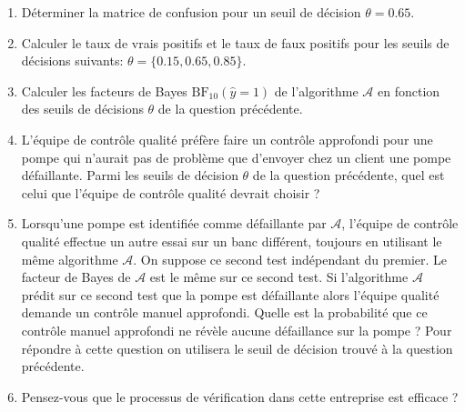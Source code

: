 \documentclass[solutions]{../exercices}
\begin{document}
\begin{exercice}
		\begin{enumerate}
			\item Déterminer la matrice de confusion pour un seuil de décision $\theta = 0.65$.
			\item Calculer le taux de vrais positifs et le taux de faux positifs pour les seuils de décisions suivants: $\theta = \{0.15, 0.65, 0.85\}$.
			\item Calculer les facteurs de Bayes $\text{BF}_{10}(\hat{y} = 1)$ de l'algorithme $\mathcal{A}$ en fonction des seuils de décisions $\theta$ de la question précédente.
			\item L'équipe de contrôle qualité préfère faire un contrôle approfondi pour une pompe qui n'aurait pas de problème que d'envoyer chez un client une pompe défaillante. Parmi les seuils de décision $\theta$ de la question précédente, quel est celui que l'équipe de contrôle qualité devrait choisir ?
			\item Lorsqu'une pompe est identifiée comme défaillante par $\mathcal{A}$, l'équipe de contrôle qualité effectue un autre essai sur un banc différent, toujours en utilisant le même algorithme $\mathcal{A}$. On suppose ce second test indépendant du premier. Le facteur de Bayes de $\mathcal{A}$ est le même sur ce second test. Si l'algorithme $\mathcal{A}$ prédit sur ce second test que la pompe est défaillante alors l'équipe qualité demande un contrôle manuel approfondi. Quelle est la probabilité que ce contrôle manuel approfondi ne révèle aucune défaillance sur la pompe ? Pour répondre à cette question on utilisera le seuil de décision trouvé à la question précédente.
			\item Pensez-vous que le processus de vérification dans cette entreprise est efficace ?
		\end{enumerate}

	\end{exercice}
\end{document}
